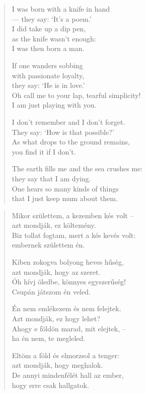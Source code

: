 \documentclass[11pt]{book}
\newcommand*{\centeredornament}{\centerline{\pgfornament[width=6cm]{88}}}
\begin{document}
\begin{verse}
  I was born with a knife in hand \\
  --- they say: `It's a poem.' \\
  I did take up a dip pen, \\
  as the knife wasn't enough: \\
  I was then born a man.

  If one wanders sobbing \\
  with passionate loyalty, \\
  they say: `He is in love.' \\
  Oh call me to your lap, tearful simplicity! \\
  I am just playing with you.

  I don't remember and I don't forget. \\
  They say: `How is that possible?' \\
  As what drops to the ground remains, \\
  you find it if I don't.

  The earth fills me and the sea crushes me: \\
  they say that I am dying. \\
  One hears so many kinds of things \\
  that I just keep mum about them.
\end{verse}

\newpage

\vspace*{-15mm}
\centeredornament



\begin{verse}
  Mikor születtem, a kezemben kés volt -- \\
  azt mondják, ez költemény. \\
  Biz tollat fogtam, mert a kés kevés volt: \\
  embernek születtem én.

  Kiben zokogva bolyong heves hűség, \\
  azt mondják, hogy az szeret. \\
  Óh hívj öledbe, könnyes egyszerűség! \\
  Csupán játszom én veled.

  Én nem emlékezem és nem felejtek. \\
  Azt mondják, ez hogy lehet? \\
  Ahogy e földön marad, mit elejtek, -- \\
  ha én nem, te megleled.

  Eltöm a föld és elmorzsol a tenger: \\
  azt mondják, hogy meghalok. \\
  De annyi mindenfélét hall az ember, \\
  hogy erre csak hallgatok.
\end{verse}
\end{document}
